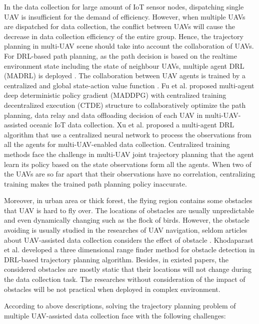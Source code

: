 \documentclass[journal]{IEEEtran}
\begin{document}
In the data collection for large amount of IoT sensor nodes, dispatching single UAV is insufficient for the demand of efficiency. However, when multiple UAVs are dispatched for data collection, the conflict between UAVs will cause the decrease in data collection efficiency of the entire group. Hence, the trajectory planning in multi-UAV scene should take into account the collaboration of UAVs. For DRL-based path planning, as the path decision is based on the realtime environment state including the state of neighbour UAVs, multiple agent DRL (MADRL) is deployed \cite{Qi24,Rahim23}. The collaboration between UAV agents is trained by a centralized and global state-action value function \cite{Qi24,Rahim23,XFu25,SXu22}. Fu et al.\cite{XFu25} proposed multi-agent deep deterministic policy gradient (MADDPG) with centralized training decentralized execution (CTDE) structure to collaboratively optimize the path planning, data relay and data offloading decision of each UAV in multi-UAV-assisted oceanic IoT data collection. Xu et al. \cite{SXu22} proposed a multi-agent DRL algorithm that use a centralized neural network to process the observations from all the agents for multi-UAV-enabled data collection. Centralized training methods face the challenge in multi-UAV joint trajectory planning that the agent learn its policy based on the state observations form all the agents. When two of the UAVs are so far apart that their observations have no correlation, centralizing training makes the trained path planning policy inaccurate. 

Moreover, in urban area or thick forest, the flying region contains some obstacles that UAV is hard to fly over. The locations of obstacles are usually unpredictable and even dynamically changing such as the flock of birds. However, the obstacle avoiding is usually studied in the researches of UAV navigation, seldom articles about UAV-assisted data collection considers the effect of  obstacle \cite{Khodaparast21,Khodaparast22,Dai23,XWang22}. Khodaparast et al. \cite{Khodaparast22} developed a three dimensional range finder method for obstacle detection in DRL-based trajectory planning algorithm. Besides, in existed papers, the considered obstacles are mostly static that their locations will not change during the data collection task. The researches without consideration of the impact of obstacles will be not practical when deployed in complex environment. 

According to above descriptions, solving the trajectory planning problem of multiple UAV-assisted data collection face with the following challenges:
\end{document}
